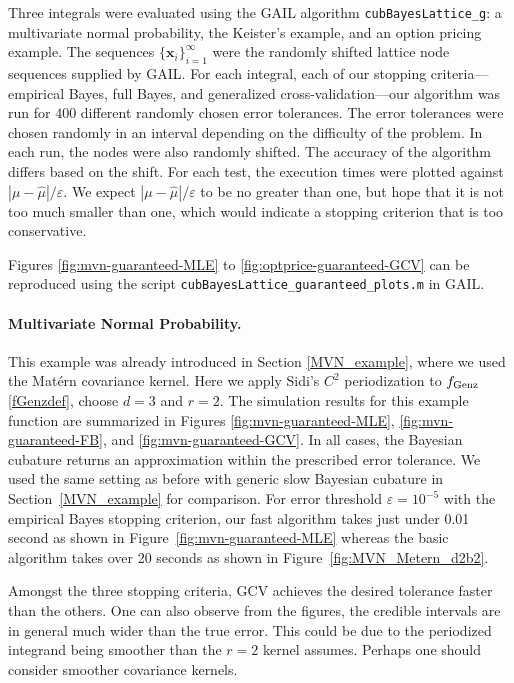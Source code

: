 \documentclass[twocolumn]{svjour3}          %
\newcommand{\bm}[1]{\boldsymbol{#1}}
\newcommand{\vx}{\bm{x}}
\newcommand{\hmu}{\widehat{\mu}}
\newcommand{\code}[1]{\texttt{#1}}
\def\abs#1{\ensuremath{\left \lvert #1 \right \rvert}}
\newcommand\figref{Figure~\ref}
\newcommand\secref{Section~\ref}
\begin{document}
Three integrals were evaluated using the GAIL algorithm \code{cubBayesLattice\_g}:  a multivariate normal probability, the Keister's example, and an option pricing example.  
The sequences $\{\vx_i\}_{i=1}^\infty$ were the randomly shifted lattice node sequences supplied by GAIL. 
For each integral,  each of our stopping criteria---empirical Bayes, full Bayes, and generalized cross-validation---our algorithm was run for $400$ different randomly chosen error tolerances. The error tolerances were chosen randomly in an interval depending on the difficulty of the problem. In each run, the nodes were also randomly shifted. The accuracy of the algorithm differs based on the shift.
For each test, the execution times were plotted against $\abs{\mu - \hmu}/\varepsilon$.  We expect $\abs{\mu - \hmu}/\varepsilon$ to be no greater than one, but hope that it is not too much smaller than one, which would indicate a stopping criterion that is too conservative. 

Figures \ref{fig:mvn-guaranteed-MLE} to \ref{fig:optprice-guaranteed-GCV} can be reproduced using the script \code{cubBayesLattice\_guaranteed\_plots.m} in GAIL.


\paragraph{Multivariate Normal Probability.}

This example was already introduced in Section \ref{MVN_example}, where we used the Mat\'ern covariance kernel.  Here we apply Sidi's $C^2$  periodization to $ f_{\textup{Genz}}$ \eqref{fGenzdef}, choose $d=3$ and $r=2$. The simulation results for this example function are summarized in Figures \ref{fig:mvn-guaranteed-MLE}, \ref{fig:mvn-guaranteed-FB}, and \ref{fig:mvn-guaranteed-GCV}.  In all cases, the Bayesian cubature returns an approximation within the prescribed error tolerance. We used the same setting as before with generic slow Bayesian cubature in \secref{MVN_example} for comparison. For error threshold $\varepsilon=10^{-5}$ with the empirical Bayes stopping criterion, our fast algorithm takes just under 0.01 second as shown in \figref{fig:mvn-guaranteed-MLE} whereas the basic algorithm takes over 20 seconds as shown in \figref{fig:MVN_Metern_d2b2}. 

Amongst the three stopping criteria, GCV achieves the desired tolerance faster than the others. 
One can also observe from the figures, the credible intervals are in general much wider than the true error.
This could be due to the periodized integrand being smoother than the $r=2$ kernel assumes. Perhaps one should consider smoother covariance kernels.
\end{document}
